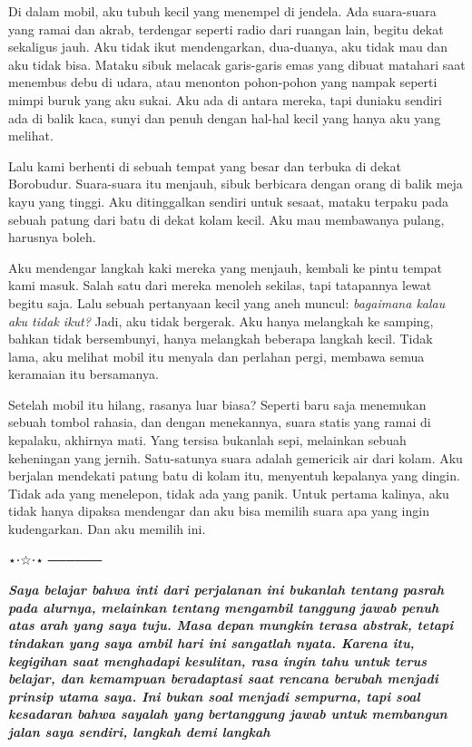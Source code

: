 \documentclass[
  letterpaper,
  DIV=11,
  numbers=noendperiod]{scrreprt}
\begin{document}
Di dalam mobil, aku tubuh kecil yang menempel di jendela. Ada
suara-suara yang ramai dan akrab, terdengar seperti radio dari ruangan
lain, begitu dekat sekaligus jauh. Aku tidak ikut mendengarkan,
dua-duanya, aku tidak mau dan aku tidak bisa. Mataku sibuk melacak
garis-garis emas yang dibuat matahari saat menembus debu di udara, atau
menonton pohon-pohon yang nampak seperti mimpi buruk yang aku sukai. Aku
ada di antara mereka, tapi duniaku sendiri ada di balik kaca, sunyi dan
penuh dengan hal-hal kecil yang hanya aku yang melihat.

Lalu kami berhenti di sebuah tempat yang besar dan terbuka di dekat
Borobudur. Suara-suara itu menjauh, sibuk berbicara dengan orang di
balik meja kayu yang tinggi. Aku ditinggalkan sendiri untuk sesaat,
mataku terpaku pada sebuah patung dari batu di dekat kolam kecil. Aku
mau membawanya pulang, harusnya boleh.

Aku mendengar langkah kaki mereka yang menjauh, kembali ke pintu tempat
kami masuk. Salah satu dari mereka menoleh sekilas, tapi tatapannya
lewat begitu saja. Lalu sebuah pertanyaan kecil yang aneh muncul:
\emph{bagaimana kalau aku tidak ikut?} Jadi, aku tidak bergerak. Aku
hanya melangkah ke samping, bahkan tidak bersembunyi, hanya melangkah
beberapa langkah kecil. Tidak lama, aku melihat mobil itu menyala dan
perlahan pergi, membawa semua keramaian itu bersamanya.

Setelah mobil itu hilang, rasanya luar biasa? Seperti baru saja
menemukan sebuah tombol rahasia, dan dengan menekannya, suara statis
yang ramai di kepalaku, akhirnya mati. Yang tersisa bukanlah sepi,
melainkan sebuah keheningan yang jernih. Satu-satunya suara adalah
gemericik air dari kolam. Aku berjalan mendekati patung batu di kolam
itu, menyentuh kepalanya yang dingin. Tidak ada yang menelepon, tidak
ada yang panik. Untuk pertama kalinya, aku tidak hanya dipaksa mendengar
dan aku bisa memilih suara apa yang ingin kudengarkan. Dan aku memilih
ini.

⋆⋅☆⋅⋆ ──────

\textbf{\emph{Saya belajar bahwa inti dari perjalanan ini bukanlah
tentang pasrah pada alurnya, melainkan tentang mengambil tanggung jawab
penuh atas arah yang saya tuju. Masa depan mungkin terasa abstrak,
tetapi tindakan yang saya ambil hari ini sangatlah nyata. Karena itu,
kegigihan saat menghadapi kesulitan, rasa ingin tahu untuk terus
belajar, dan kemampuan beradaptasi saat rencana berubah menjadi prinsip
utama saya. Ini bukan soal menjadi sempurna, tapi soal kesadaran bahwa
sayalah yang bertanggung jawab untuk membangun jalan saya sendiri,
langkah demi langkah}}
\end{document}
